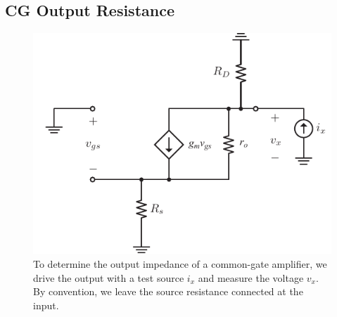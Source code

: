 \subsection{CG Output Resistance}
\begin{figure}[tb]
\begin{center}
\includegraphics[scale=.9]{cgamp_is_ac_ss_rout}
\end{center}
\caption{To determine the output impedance of a common-gate amplifier, we drive the output with a test source $i_x$ and measure the voltage $v_x$.  By convention, we leave the source resistance connected at the input.}
\label{fig:cgamp_is_ac_ss_rout}
\end{figure}

